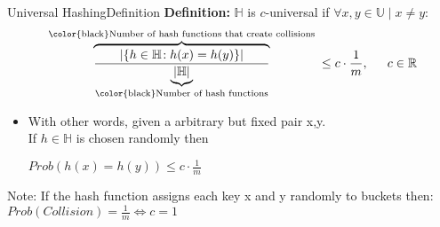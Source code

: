 
\begin{frame}{Universal Hashing}{Definition}
  \textbf{Definition:}
  {\color{Mittel-Blau}$\mathbb{H}$} is {\color{Mittel-Blau}$c$-universal} if
  {\color{Mittel-Blau}$\forall x, y \in \mathbb{U} \mid x \neq y:$
  \begin{displaymath}
    \overbrace{
      \frac{
        \vert \{h \in \mathbb{H}\!: h(x) = h(y)\} \vert
      }{
      \underbrace{\vert \mathbb{H} \vert}_\text{{\color{black}Number of hash functions}}
      }
    }^\text{
      {\color{black}Number of hash functions that create collisions}
    }
    \leq c \cdot \frac{1}{m}, \hspace*{1.5em} c \in \mathbb{R}
  \end{displaymath}}
  \vspace{-1em}
  \begin{itemize}
  \item <2->
      With other words, given a arbitrary but fixed pair x{\color{Mittel-Blau},y}.\\
      If {\color{Mittel-Blau}$h \in \mathbb{H}$} is chosen randomly then\\
      \begin{centering}{\color{Mittel-Blau}$Prob ( h(x) = h(y) ) \leq c \cdot \frac{1}{m}$}\end{centering}
  \end{itemize}
  \begin{block}{Note: If the hash function assigns each key x and y
      randomly to buckets then:}
    {\color{Mittel-Blau}$Prob( Collision ) = \frac{1}{m} \Leftrightarrow c = 1$}
  \end{block}
\end{frame}



